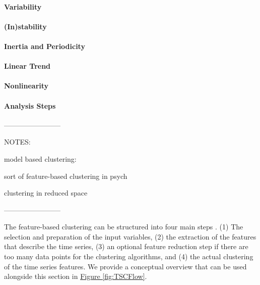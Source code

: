 \documentclass[man, 12pt, a4paper, mask]{apa7}
\theoremstyle{break}
\theoremstyle{plain}
\newcommand{\fgrref}[2][]{\hyperref[#2]{Figure \ref*{#2}#1}}
\begin{document}
\paragraph{Variability}

\paragraph{(In)stability}

\paragraph{Inertia and Periodicity}

\paragraph{Linear Trend}

\paragraph{Nonlinearity}

\paragraph{Analysis Steps}

------------------------

NOTES:

model based clustering: \citep{bulteel2016, stefanovic2022}

sort of feature-based clustering in psych \citep{heylen2016}

clustering in reduced space \citep{timmerman2013}

------------------------

The feature-based clustering can be structured into four main steps \citep{rasanen2009, wang2006}. (1) The selection and preparation of the input variables, (2) the extraction of the features that describe the time series, (3) an optional feature reduction step if there are too many data points for the clustering algorithms, and (4) the actual clustering of the time series features. We provide a conceptual overview that can be used alongside this section in \fgrref{fig:TSCFlow}. 
\end{document}
